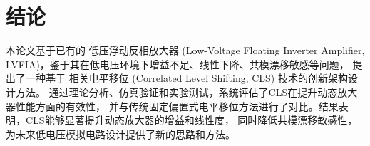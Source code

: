 \section{结论}

本论文基于已有的 低压浮动反相放大器 (Low-Voltage Floating Inverter Amplifier, LVFIA)，鉴于其在低电压环境下增益不足、线性下降、共模漂移敏感等问题，
提出了一种基于 相关电平移位 (Correlated Level Shifting, CLS) 技术的创新架构设计方法。
通过理论分析、仿真验证和实验测试，系统评估了CLS在提升动态放大器性能方面的有效性，
并与传统固定偏置式电平移位方法进行了对比。结果表明，CLS能够显著提升动态放大器的增益和线性度，
同时降低共模漂移敏感性，为未来低电压模拟电路设计提供了新的思路和方法。

